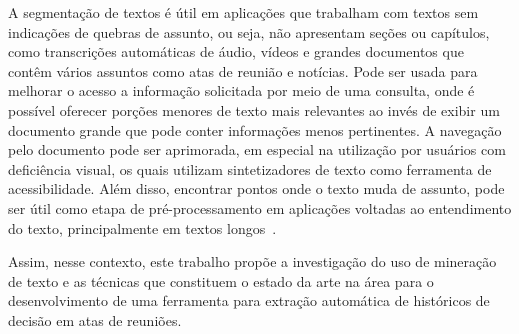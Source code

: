 A segmentação de textos é útil em aplicações que trabalham com textos sem indicações de quebras de assunto, ou seja, não apresentam seções ou capítulos, como transcrições automáticas de áudio, vídeos e grandes documentos que contêm vários assuntos como atas de reunião e notícias. Pode ser usada para melhorar o acesso a informação solicitada por meio de uma consulta, onde é possível oferecer porções menores de texto mais relevantes ao invés de exibir um documento grande que pode conter informações menos pertinentes. A navegação pelo documento pode ser aprimorada, em especial na utilização por usuários com deficiência visual, os quais utilizam  sintetizadores de texto como ferramenta de acessibilidade. Além disso, encontrar pontos onde o texto muda de assunto, pode ser útil como etapa de pré-processamento em aplicações voltadas ao entendimento do texto, principalmente em textos longos~\cite{Choi2000}.




Assim, nesse contexto, este trabalho propõe a investigação do uso de mineração de texto e as técnicas que constituem o estado da arte na área para o desenvolvimento de uma ferramenta para extração automática de históricos de decisão em atas de reuniões.
